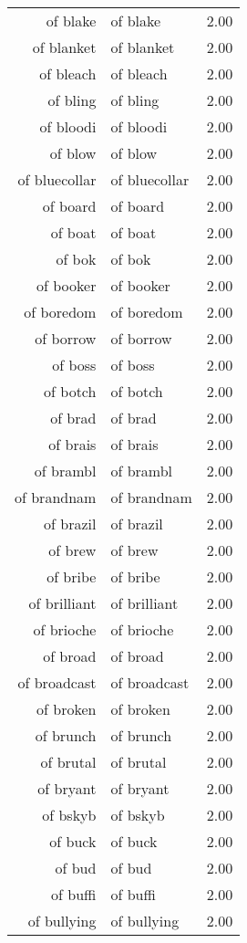 \begin{table}[ht]
\begin{tabular}{rlr}
  of blake & of blake & 2.00 \\ 
  of blanket & of blanket & 2.00 \\ 
  of bleach & of bleach & 2.00 \\ 
  of bling & of bling & 2.00 \\ 
  of bloodi & of bloodi & 2.00 \\ 
  of blow & of blow & 2.00 \\ 
  of bluecollar & of bluecollar & 2.00 \\ 
  of board & of board & 2.00 \\ 
  of boat & of boat & 2.00 \\ 
  of bok & of bok & 2.00 \\ 
  of booker & of booker & 2.00 \\ 
  of boredom & of boredom & 2.00 \\ 
  of borrow & of borrow & 2.00 \\ 
  of boss & of boss & 2.00 \\ 
  of botch & of botch & 2.00 \\ 
  of brad & of brad & 2.00 \\ 
  of brais & of brais & 2.00 \\ 
  of brambl & of brambl & 2.00 \\ 
  of brandnam & of brandnam & 2.00 \\ 
  of brazil & of brazil & 2.00 \\ 
  of brew & of brew & 2.00 \\ 
  of bribe & of bribe & 2.00 \\ 
  of brilliant & of brilliant & 2.00 \\ 
  of brioche & of brioche & 2.00 \\ 
  of broad & of broad & 2.00 \\ 
  of broadcast & of broadcast & 2.00 \\ 
  of broken & of broken & 2.00 \\ 
  of brunch & of brunch & 2.00 \\ 
  of brutal & of brutal & 2.00 \\ 
  of bryant & of bryant & 2.00 \\ 
  of bskyb & of bskyb & 2.00 \\ 
  of buck & of buck & 2.00 \\ 
  of bud & of bud & 2.00 \\ 
  of buffi & of buffi & 2.00 \\ 
  of bullying & of bullying & 2.00 \\ 

\end{tabular}
\end{table}
